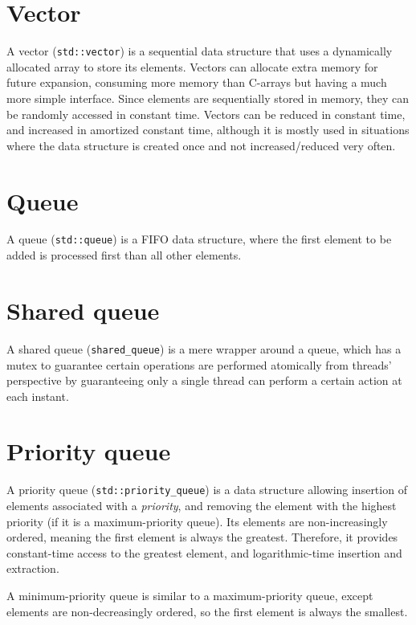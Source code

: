 \section{Vector}
A vector (\texttt{std::vector}) is a sequential data structure that uses a dynamically allocated array to store its elements. Vectors can allocate extra memory for future expansion, consuming more memory than C-arrays but having a much more simple interface. Since elements are sequentially stored in memory, they can be randomly accessed in constant time. Vectors can be reduced in constant time, and increased in amortized constant time, although it is mostly used in situations where the data structure is created once and not increased/reduced very often.

\section{Queue}
A queue (\texttt{std::queue}) is a FIFO data structure, where the first element to be added is processed first than all other elements.

\section{Shared queue}
A shared queue (\texttt{shared\_queue}) is a mere wrapper around a queue, which has a mutex to guarantee certain operations are performed atomically from threads' perspective by guaranteeing only a single thread can perform a certain action at each instant.

\section{Priority queue}
A priority queue (\texttt{std::priority\_queue}) is a data structure allowing insertion of elements associated with a \emph{priority}, and removing the element with the highest priority (if it is a maximum-priority queue). Its elements are non-increasingly ordered, meaning the first element is always the greatest. Therefore, it provides constant-time access to the greatest element, and logarithmic-time insertion and extraction.\par
A minimum-priority queue is similar to a maximum-priority queue, except elements are non-decreasingly ordered, so the first element is always the smallest.

